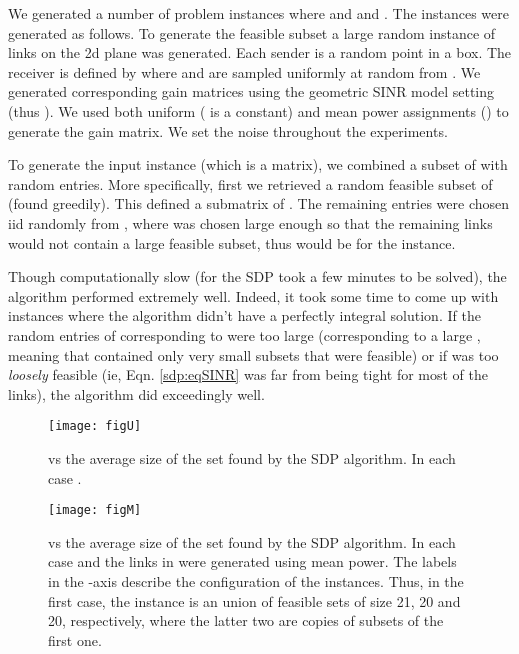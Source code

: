 \documentclass[11pt]{amsart}
\begin{document}
We generated a number of problem instances where  and  and . The instances
were generated as follows. To generate the feasible subset a large random instance  of links on the 2d plane was generated. Each sender  is a random point in a  box. The receiver  is defined by  where  and  are sampled uniformly at random from . We generated  corresponding gain matrices using the geometric SINR model setting  (thus ). We used both uniform ( is a constant) and mean power assignments () to generate the gain matrix. We set the noise  throughout the experiments.

To generate the input instance  (which is a  matrix), we combined a subset of  with random entries.
More specifically, first we retrieved a random feasible subset  of  (found greedily). This defined a
 submatrix of . The remaining entries were chosen iid randomly from , where
 was chosen large enough so that the remaining  links would not contain a large feasible subset, thus  would be  for the instance.

Though computationally slow (for  the SDP took a few minutes to be solved), the algorithm performed extremely well. Indeed, it took some time to come up with instances where the algorithm didn't have a perfectly integral solution. If the random entries of  corresponding to  were too large (corresponding to a large , meaning that  contained only very small subsets that were feasible) or if  was too \emph{loosely} feasible (ie, Eqn. \ref{sdp:eqSINR} was far from being tight for most of the links), the algorithm did exceedingly well.



\begin{figure}
\begin{center}
\texttt{[image: figU]}
\caption{ vs the average size of the set found by the SDP algorithm. In each case .} \label{fig:uniform}
\end{center}
\end{figure}

\begin{figure}
\begin{center}
\texttt{[image: figM]}
\caption{ vs the average size of the set found by the SDP algorithm. In each case  and the links in  were generated using mean power. The labels in the -axis describe the configuration of the instances. Thus, in the first case, the instance is an union of  feasible sets of size 21, 20 and 20, respectively, where the latter two are copies of subsets of the first one.} \label{fig:mean}
\end{center}
\end{figure}
\end{document}
